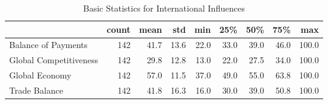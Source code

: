 \documentclass[a4paper,12pt]{article}
\begin{document}
        
        \begin{landscape}
        \begin{table}
\caption{Basic Statistics for International Influences}
\label{tab:statistics_International_Influences}
\begin{tabular}{lrrrrrrrr}
\toprule
 & count & mean & std & min & 25\% & 50\% & 75\% & max \\
\midrule
Balance of Payments & 142 & 41.7 & 13.6 & 22.0 & 33.0 & 39.0 & 46.0 & 100.0 \\
Global Competitiveness & 142 & 29.8 & 12.8 & 13.0 & 22.0 & 27.5 & 34.0 & 100.0 \\
Global Economy & 142 & 57.0 & 11.5 & 37.0 & 49.0 & 55.0 & 63.8 & 100.0 \\
Trade Balance & 142 & 41.8 & 16.3 & 16.0 & 30.0 & 39.0 & 50.8 & 100.0 \\
\bottomrule
\end{tabular}
\end{table}

        \end{landscape}
        
        
\end{document}
